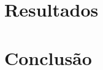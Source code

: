 \documentclass[mestrado,qualificacao]{packages/ppg}
\newif\ifmostrarnotas   \mostrarnotastrue
\newcommand{\pendente}[1]{\ifmostrarnotas
  \par\noindent\colorbox{yellow!60}{\parbox{\dimexpr\linewidth-2\fboxsep\relax}{\raggedright #1}}\par
  \else #1\fi}
\begin{document}
\chapter{Resultados}
\label{chp:resultados}


\chapter{Conclusão}
\label{chp:conclusao}




% 

\postextual

\nocite{islam2025,ana2021}
\printbibliography[title={REFERÊNCIAS}]
\printglossary

%



\end{document}
